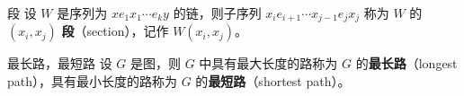 \begin{definition}{段}
设 $W$ 是序列为 $xe_1x_1\cdots e_ky$ 的链，则子序列 $x_ie_{i+1}\cdots x_{j-1}e_{j}x_j$ 称为 $W$ 的 $(x_i,x_j)$ \textbf{段}（section），记作 $W(x_i,x_j)$。
\end{definition}

\begin{definition}{最长路，最短路}
设 $G$ 是图，则 $G$ 中具有最大长度的路称为 $G$ 的\textbf{最长路}（longest path），具有最小长度的路称为 $G$ 的\textbf{最短路}（shortest path）。
\end{definition}




 







